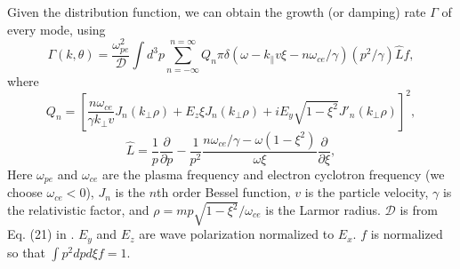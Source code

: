 \documentclass[aps, prl, preprint,english,superscriptaddress]{revtex4-1}
\begin{document}
Given the distribution function, we can obtain the growth (or damping) rate $\Gamma$ of every mode, using\cite{aleynikov_stability_2015}
\begin{equation}
\label{eq:growth-rate}
\Gamma(k,\theta)  = \frac{{\omega _{pe}^2}}{\mathcal{D}}\int {{d^3}p\mathop \sum \limits_{n =  - \infty }^{n = \infty } {Q_n}\pi \delta (\omega  - {k_\parallel }v\xi  - n{\omega _{ce}}/\gamma )(p^{2}/\gamma)\hat L f},
\end{equation}
where
\begin{equation}
{Q_n} = {\left[ {\frac{{n{\omega _{ce}}}}{{\gamma {k_ \bot }v}}{J_n}({k_ \bot }\rho ) + {E_z}\xi {J_n}({k_ \bot }\rho ) + i{E_y}\sqrt {1 - {\xi ^2}} J{'_n}({k_ \bot }\rho )} \right]^2},
\end{equation}
\begin{equation}
\hat L =  {\frac{1}{p}\frac{{\partial}}{{\partial p}} - \frac{1}{p^{2}}\frac{{n{\omega _{ce}}/\gamma  - \omega (1 - {\xi ^2})}}{{\omega \xi }}\frac{{\partial }}{{\partial \xi }}},
\end{equation}
Here $\omega_{pe}$ and $\omega_{ce}$ are the plasma frequency and electron cyclotron frequency (we choose $\omega_{ce}<0$), $J_{n}$ is the $n$th order Bessel function, $v$ is the particle velocity, %
$\gamma$ is the relativistic factor, and $\rho=m p\sqrt{1-\xi^2}/\omega_{ce}$ is the Larmor radius. $\mathcal{D}$ is from Eq. (21) in \cite{aleynikov_stability_2015}. $E_{y}$ and $E_{z}$ are wave polarization normalized to $E_{x}$. $f$ is normalized so that $\int p^{2}dp d\xi f=1$.
\end{document}
